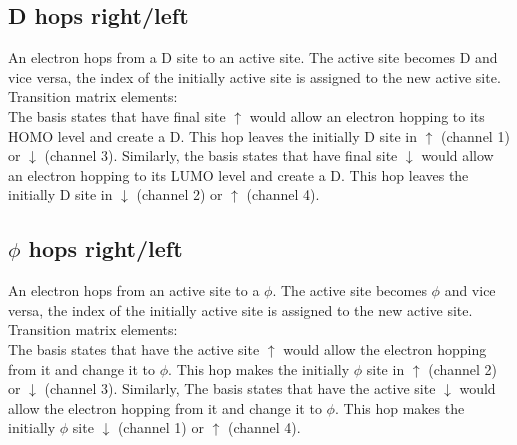 \documentclass[a4paper]{revtex4-1} %
\newcommand{\da}{\downarrow}
\newcommand{\ua}{\uparrow}
\begin{document}
\subsection{D hops right/left}
An electron hops from a D site to an active site.
The active site becomes D and vice versa, the index of the initially active site is assigned to the new active site. 
\\Transition matrix elements:\\
The basis states that have final site $\ua$ would allow 
an electron hopping to its HOMO level and create a D.
This hop leaves the initially D site in $\ua$ (channel 1) or $\da$  (channel 3).
Similarly,
the basis states that have final site $\da$ would allow 
an electron hopping to its LUMO level and create a D.
This hop leaves the initially D site in $\da$ (channel 2) or $\ua$  (channel 4).



\subsection{$\phi$ hops right/left}
An electron hops from an active site to a $\phi$.
The active site becomes $\phi$ and vice versa, the index of the initially active site is assigned to the new active site. 
\\Transition matrix elements:\\
The basis states that have the active site $\ua$ would allow 
the electron hopping from it and change it to $\phi$.
This hop makes the initially $\phi$ site in $\ua$ (channel 2) or $\da$  (channel 3).
Similarly,
The basis states that have the active site $\da$ would allow 
the electron hopping from it and change it to $\phi$.
This hop makes the initially $\phi$ site $\da$ (channel 1) or $\ua$  (channel 4).
\end{document}
